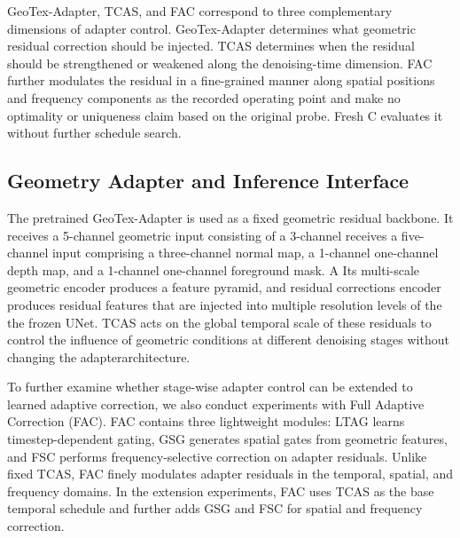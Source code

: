 \documentclass[times,twocolumn,final]{elsarticle}
\providecommand{\DIFadd}[1]{{\protect\color{blue} \sf #1}} %
\providecommand{\DIFdel}[1]{{\protect\color{red} \scriptsize #1}} %
\providecommand{\DIFaddbegin}{} %
\providecommand{\DIFaddend}{} %
\providecommand{\DIFdelbegin}{} %
\providecommand{\DIFdelend}{} %
\begin{document}

\DIFdel{GeoTex-Adapter, TCAS, and FAC correspond to three complementary dimensions of adapter control. GeoTex-Adapter determines what geometric residual correction should be injected. TCAS determines when the residual should be strengthened or weakened along the denoising-time dimension. FAC further modulates the residual in a fine-grained manner along spatial positions and frequency components}\DIFdelend \DIFaddbegin \DIFadd{as the recorded operating point and make no optimality or uniqueness claim based on the original probe. Fresh C evaluates it without further schedule search}\DIFaddend .

\DIFaddbegin \subsection{Geometry Adapter and Inference Interface}
\label{subsec:adapterimpl}

\DIFadd{The pretrained }\DIFaddend GeoTex-Adapter \DIFdelbegin \DIFdel{is used as a fixed geometric residual backbone. It receives a 5-channel geometric input consisting of a 3-channel }\DIFdelend \DIFaddbegin \DIFadd{receives a five-channel input comprising a three-channel }\DIFaddend normal map, a \DIFdelbegin \DIFdel{1-channel }\DIFdelend \DIFaddbegin \DIFadd{one-channel }\DIFaddend depth map, and a \DIFdelbegin \DIFdel{1-channel }\DIFdelend \DIFaddbegin \DIFadd{one-channel }\DIFaddend foreground mask. \DIFdelbegin \DIFdel{A }\DIFdelend \DIFaddbegin \DIFadd{Its }\DIFaddend multi-scale \DIFdelbegin \DIFdel{geometric encoder produces a feature pyramid, and residual corrections }\DIFdelend \DIFaddbegin \DIFadd{encoder produces residual features that }\DIFaddend are injected into \DIFdelbegin \DIFdel{multiple resolution levels of the }\DIFdelend \DIFaddbegin \DIFadd{the frozen }\DIFaddend UNet. TCAS acts on the \DIFdelbegin \DIFdel{global temporal scale of these residuals to control the influence of geometric conditions at different denoising stages without changing the adapterarchitecture.
}%

\DIFdel{To further examine whether stage-wise adapter control can be extended to learned adaptive correction, we also conduct experiments with Full Adaptive Correction (FAC). FAC contains three lightweight modules: LTAG learns timestep-dependent gating, GSG generates spatial gates from geometric features, and FSC performs frequency-selective correction on adapter residuals.
Unlike fixed TCAS, FAC finely modulates adapter residuals in the temporal, spatial, and frequency domains. In the extension experiments, FAC uses TCAS as the base temporal schedule and further adds GSG and FSC for spatial and frequency correction.
}%
\end{document}
